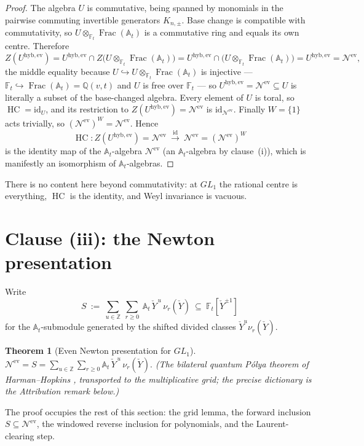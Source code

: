 \documentclass[11pt]{article}
\newtheorem{theorem}{Theorem}
\newcommand{\At}{\mathbb{A}_t}
\newcommand{\Ft}{\mathbb{F}_t}
\newcommand{\Nev}{\mathcal N^{\mathrm{ev}}}
\newcommand{\Uev}{U^{\mathrm{hyb,ev}}}
\newcommand{\HC}{\operatorname{HC}}
\newcommand{\Yc}{\check Y}
\newcommand{\Z}{\mathbb Z}
\begin{document}
\begin{proof}
The algebra $U$ is commutative, being spanned by monomials in the pairwise
commuting invertible generators $K_{n,\pm}$. Base change is compatible with
commutativity, so $U\otimes_{\Ft}\operatorname{Frac}(\At)$ is a commutative ring
and equals its own centre. Therefore
\[
  Z(\Uev)=\Uev\cap Z\bigl(U\otimes_{\Ft}\operatorname{Frac}(\At)\bigr)
        =\Uev\cap\bigl(U\otimes_{\Ft}\operatorname{Frac}(\At)\bigr)
        =\Uev=\Nev,
\]
the middle equality because $U\hookrightarrow U\otimes_{\Ft}\operatorname{Frac}(\At)$
is injective --- $\Ft\hookrightarrow\operatorname{Frac}(\At)=\mathbb Q(v,t)$ and $U$ is
free over $\Ft$ --- so $\Uev=\Nev\subseteq U$ is literally a subset of the base-changed
algebra.
Every element of $U$ is toral, so $\HC=\mathrm{id}_U$, and its restriction to
$Z(\Uev)=\Nev$ is $\mathrm{id}_{\Nev}$. Finally $W=\{1\}$ acts trivially, so
$(\Nev)^{W}=\Nev$. Hence
\[
  \HC\colon Z(\Uev)=\Nev\ \xrightarrow{\ \mathrm{id}\ }\ \Nev=(\Nev)^{W}
\]
is the identity map of the $\At$-algebra $\Nev$ (an $\At$-algebra by clause~(i)),
which is manifestly an isomorphism of $\At$-algebras.
\end{proof}

\noindent
There is no content here beyond commutativity: at $GL_1$ the rational centre is
everything, $\HC$ is the identity, and Weyl invariance is vacuous.

\section{Clause (iii): the Newton presentation}

Write
\[
  S\ :=\ \sum_{u\in\Z}\ \sum_{r\ge0}\ \At\,\Yc^{\,u}\,\nu_{r}(\Yc)\ \subseteq\
  \Ft[\Yc^{\pm1}]
\]
for the $\At$-submodule generated by the shifted divided classes
$\Yc^{u}\nu_r(\Yc)$.

\begin{theorem}[Even Newton presentation for $GL_1$]\label{thm:iii}
$\displaystyle \Nev=S=\sum_{u\in\Z}\sum_{r\ge0}\At\,\Yc^{\,u}\,\nu_r(\Yc).$
(The bilateral quantum P\'olya theorem of Harman--Hopkins
\cite[\S\S1,4]{HarmanHopkins}, transported to the multiplicative grid; the
precise dictionary is the Attribution remark below.)
\end{theorem}

The proof occupies the rest of this section: the grid lemma, the forward
inclusion $S\subseteq\Nev$, the windowed reverse inclusion for polynomials, and
the Laurent-clearing step.
\end{document}
